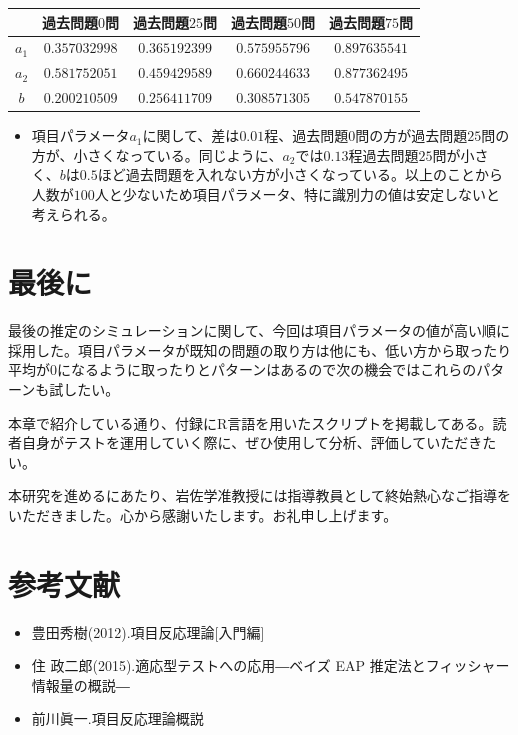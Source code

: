 \documentclass[12pt]{jarticle}
\numberwithin{equation}{subsection}
\begin{document}
\begin{table}[H]
  \begin{center}
    \begin{tabular}{|c||c|c|c|c|} \hline
      & 過去問題$0$問& 過去問題$25$問 & 過去問題$50$問 & 過去問題$75$問\\ \hline \hline
      $a_1$ & $0.357032998$	& $0.365192399$	& $0.575955796$	& $0.897635541$
      \\ \hline
      $a_2$ & $0.581752051$	& $0.459429589$	& $0.660244633$	& $0.877362495$
      \\ \hline
      $b$ & $0.200210509$	& $0.256411709$	& $0.308571305$	& $0.547870155$
      \\ \hline
    \end{tabular}
  \end{center}
\end{table}
\begin{itemize}
  \item 項目パラメータ$a_1$に関して、差は$0.01$程、過去問題$0$問の方が過去問題$25$問の方が、小さくなっている。同じように、$a_2$では$0.13$程過去問題$25$問が小さく、$b$は$0.5$ほど過去問題を入れない方が小さくなっている。以上のことから人数が$100$人と少ないため項目パラメータ、特に識別力の値は安定しないと考えられる。
\end{itemize}
\section{最後に}
最後の推定のシミュレーションに関して、今回は項目パラメータの値が高い順に採用した。項目パラメータが既知の問題の取り方は他にも、低い方から取ったり平均が$0$になるように取ったりとパターンはあるので次の機会ではこれらのパターンも試したい。

本章で紹介している通り、付録にR言語を用いたスクリプトを掲載してある。読者自身がテストを運用していく際に、ぜひ使用して分析、評価していただきたい。

本研究を進めるにあたり、岩佐学准教授には指導教員として終始熱心なご指導をいただきました。心から感謝いたします。お礼申し上げます。

\section*{参考文献}
\begin{itemize}
  \item 豊田秀樹(2012).\hspace{3pt}項目反応理論[入門編]
  \item 住 政二郎(2015).\hspace{3pt}適応型テストへの応用―ベイズ EAP 推定法とフィッシャー情報量の概説―
  \item 前川眞一.\hspace{3pt}項目反応理論概説
\end{itemize}
\end{document}
